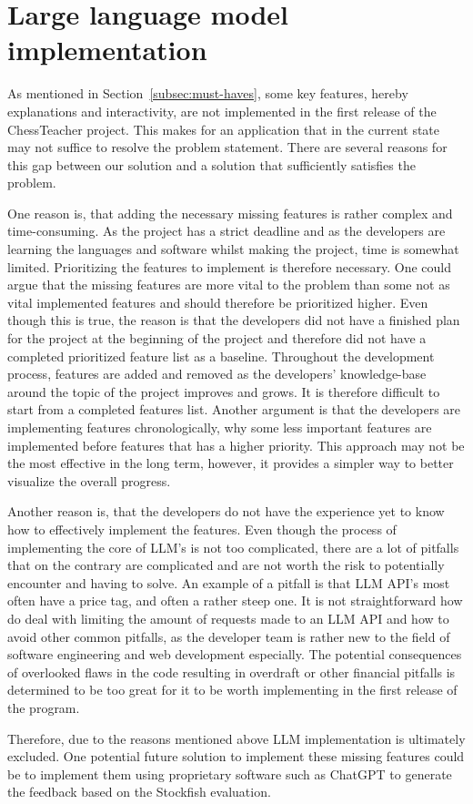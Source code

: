 \section{Large language model implementation}\label{sec:large-language-model-implementation}

As mentioned in Section~\ref{subsec:must-haves}, some key features, hereby explanations and interactivity, are not
implemented in the first release of the ChessTeacher project.
This makes for an application that in the current state may not suffice to resolve the problem statement.
There are several reasons for this gap between our solution and a solution that sufficiently satisfies the problem.

One reason is, that adding the necessary missing features is rather complex and time-consuming.
As the project has a strict deadline and as the developers are learning the languages and software whilst making the
project, time is somewhat limited.
Prioritizing the features to implement is therefore necessary.
One could argue that the missing features are more vital to the problem than some not as vital implemented features
and should therefore be prioritized higher.
Even though this is true, the reason is that the developers did not have a finished plan for the project at the
beginning of the project and therefore did not have a completed prioritized feature list as a baseline.
Throughout the development process, features are added and removed as the developers' knowledge-base around the topic of
the project improves and grows.
It is therefore difficult to start from a completed features list.
Another argument is that the developers are implementing features chronologically, why some less important features are
implemented before features that has a higher priority.
This approach may not be the most effective in the long term, however, it provides a simpler way to better visualize the
overall progress.

Another reason is, that the developers do not have the experience yet to know how to effectively implement the features.
Even though the process of implementing the core of LLM's is not too complicated, there are a lot of pitfalls that on
the contrary are complicated and are not worth the risk to potentially encounter and having to solve.
An example of a pitfall is that LLM API's most often have a price tag, and often a rather steep one.
It is not straightforward how do deal with limiting the amount of requests made to an LLM API and how to avoid other
common pitfalls, as the developer team is rather new to the field of software engineering and web development
especially.
The potential consequences of overlooked flaws in the code resulting in overdraft or other financial pitfalls is
determined to be too great for it to be worth implementing in the first release of the program.

Therefore, due to the reasons mentioned above LLM implementation is ultimately excluded.
One potential future solution to implement these missing features could be to implement them using proprietary software
such as ChatGPT to generate the feedback based on the Stockfish evaluation.
